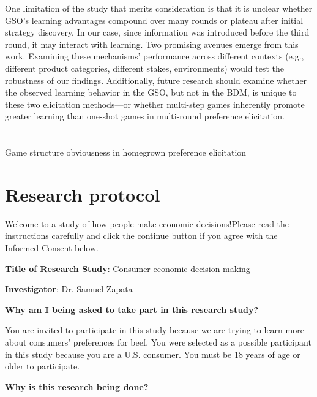 \documentclass[12pt]{article}
\begin{document}
One limitation of the study that merits consideration is that it is unclear whether GSO's learning advantages compound over many rounds or plateau after initial strategy discovery. In our case, since information was introduced before the third round, it may interact with learning.
Two promising avenues emerge from this work. Examining these mechanisms' performance across different contexts (e.g., different product categories, different stakes, environments) would test the robustness of our findings. Additionally, future research should examine whether the observed learning behavior in the GSO, but not in the BDM, is unique to these two elicitation methods—or whether multi-step games inherently promote greater learning than one-shot games in multi-round preference elicitation.





\newpage
	\singlespacing
	\appendix
	\setcounter{table}{0}
	\setcounter{figure}{0}
	\renewcommand{\thetable}{A\arabic{table}}
	\renewcommand{\thefigure}{A\arabic{figure}}
	\setcounter{page}{1}
	\renewcommand{\thesubsection}{\Alph{subsection}}

	\section*{}
	{\centering \LARGE Game structure obviousness in homegrown preference elicitation
		
		\vspace{0.5cm}
		\renewcommand*{\thefootnote}{\fnsymbol{footnote}}
		\setcounter{footnote}{0}
		
		\large
        }


        
\section{Research protocol}

Welcome to a study of how people make economic decisions!Please read the instructions carefully and click the continue button if you agree with the Informed Consent below.

\textbf{Title of Research Study}: Consumer economic decision-making

\textbf{Investigator}: Dr. Samuel Zapata

\textbf{Why am I being asked to take part in this research study?}

You are invited to participate in this study because we are trying to learn more about consumers' preferences for beef. You were selected as a possible participant in this study because you are a U.S. consumer. You must be 18 years of age or older to participate. \par
\textbf{Why is this research being done?} \par
\end{document}
